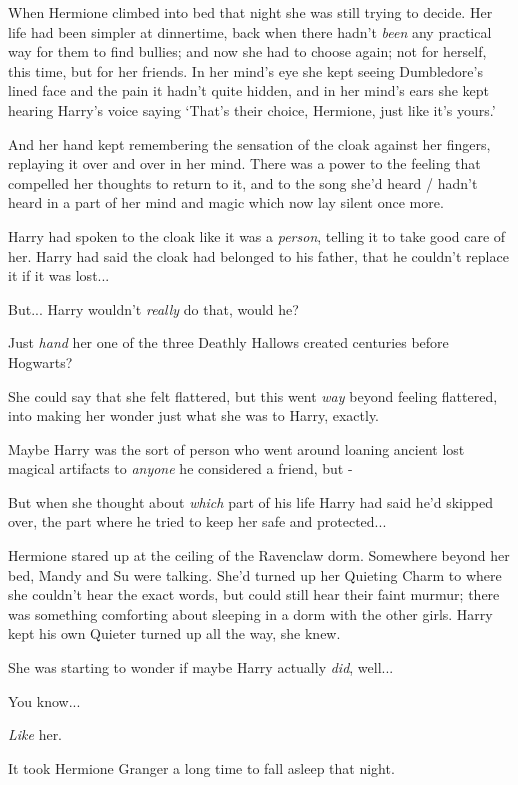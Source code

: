 When Hermione climbed into bed that night she was still trying to
decide. Her life had been simpler at dinnertime, back when there hadn't
\emph{been} any practical way for them to find bullies; and now she had
to choose again; not for herself, this time, but for her friends. In her
mind's eye she kept seeing Dumbledore's lined face and the pain it
hadn't quite hidden, and in her mind's ears she kept hearing Harry's
voice saying `That's their choice, Hermione, just like it's yours.'

And her hand kept remembering the sensation of the cloak against her
fingers, replaying it over and over in her mind. There was a power to
the feeling that compelled her thoughts to return to it, and to the song
she'd heard / hadn't heard in a part of her mind and magic which now lay
silent once more.

Harry had spoken to the cloak like it was a \emph{person}, telling it to
take good care of her. Harry had said the cloak had belonged to his
father, that he couldn't replace it if it was lost...

But... Harry wouldn't \emph{really} do that, would he?

Just \emph{hand} her one of the three Deathly Hallows created centuries
before Hogwarts?

She could say that she felt flattered, but this went \emph{way} beyond
feeling flattered, into making her wonder just what she was to Harry,
exactly.

Maybe Harry was the sort of person who went around loaning ancient lost
magical artifacts to \emph{anyone} he considered a friend, but -

But when she thought about \emph{which} part of his life Harry had said
he'd skipped over, the part where he tried to keep her safe and
protected...

Hermione stared up at the ceiling of the Ravenclaw dorm. Somewhere
beyond her bed, Mandy and Su were talking. She'd turned up her Quieting
Charm to where she couldn't hear the exact words, but could still hear
their faint murmur; there was something comforting about sleeping in a
dorm with the other girls. Harry kept his own Quieter turned up all the
way, she knew.

She was starting to wonder if maybe Harry actually \emph{did},
well...

You know...

\emph{Like} her.

It took Hermione Granger a long time to fall asleep that night.

